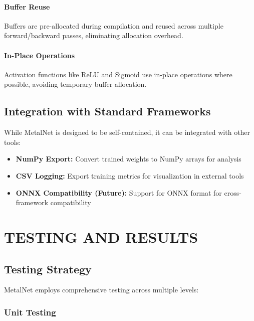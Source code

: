 \documentclass[12pt,oneside,a4paper]{report}
\begin{document}
\subsubsection{Buffer Reuse}

Buffers are pre-allocated during compilation and reused across multiple forward/backward passes, eliminating allocation overhead.

\subsubsection{In-Place Operations}

Activation functions like ReLU and Sigmoid use in-place operations where possible, avoiding temporary buffer allocation.

\section{Integration with Standard Frameworks}

While MetalNet is designed to be self-contained, it can be integrated with other tools:

\begin{itemize}
    \item \textbf{NumPy Export:} Convert trained weights to NumPy arrays for analysis
    \item \textbf{CSV Logging:} Export training metrics for visualization in external tools
    \item \textbf{ONNX Compatibility (Future):} Support for ONNX format for cross-framework compatibility
\end{itemize}

\newpage

\chapter{TESTING AND RESULTS}

\section{Testing Strategy}

MetalNet employs comprehensive testing across multiple levels:

\subsection{Unit Testing}
\end{document}
